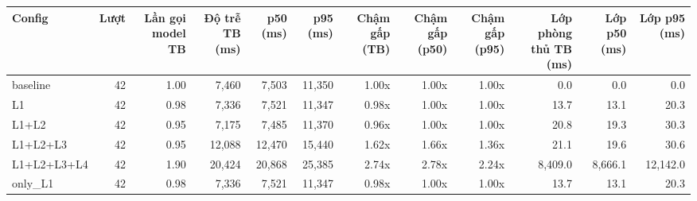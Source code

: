 \begin{tabular}{lrrrrrrrrrrr}
\toprule
Config & Lượt & Lần gọi model TB & Độ trễ TB (ms) & p50 (ms) & p95 (ms) & Chậm gấp (TB) & Chậm gấp (p50) & Chậm gấp (p95) & Lớp phòng thủ TB (ms) & Lớp p50 (ms) & Lớp p95 (ms) \\
\midrule
baseline & 42 & 1.00 & 7,460 & 7,503 & 11,350 & 1.00x & 1.00x & 1.00x & 0.0 & 0.0 & 0.0 \\
L1 & 42 & 0.98 & 7,336 & 7,521 & 11,347 & 0.98x & 1.00x & 1.00x & 13.7 & 13.1 & 20.3 \\
L1+L2 & 42 & 0.95 & 7,175 & 7,485 & 11,370 & 0.96x & 1.00x & 1.00x & 20.8 & 19.3 & 30.3 \\
L1+L2+L3 & 42 & 0.95 & 12,088 & 12,470 & 15,440 & 1.62x & 1.66x & 1.36x & 21.1 & 19.6 & 30.6 \\
L1+L2+L3+L4 & 42 & 1.90 & 20,424 & 20,868 & 25,385 & 2.74x & 2.78x & 2.24x & 8,409.0 & 8,666.1 & 12,142.0 \\
only\_L1 & 42 & 0.98 & 7,336 & 7,521 & 11,347 & 0.98x & 1.00x & 1.00x & 13.7 & 13.1 & 20.3 \\
\bottomrule
\end{tabular}
